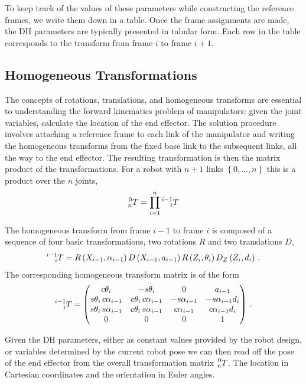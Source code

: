 \documentclass[11pt, onecolumn, oneside, reqno]{article}
\begin{document}
To keep track of the values of these parameters while constructing the reference frames, we write them down in a table. Once the frame assignments are made, the DH parameters are typically presented in tabular form. Each row in the table corresponds to the transform from frame $i$ to frame $i+1$.

\subsection{Homogeneous Transformations}
The concepts of rotations, translations, and homogeneous transforms are essential to understanding the forward kinematics problem of manipulators: given the joint variables, calculate the location of the end effector. The solution procedure involves attaching a reference frame to each link of the manipulator and writing the homogeneous transforms from the fixed base link to the subsequent links, all the way to the end effector.  The resulting transformation is then the matrix product of the transformations. For a robot with $n + 1$ links $\left\lbrace 0, \ldots , n\right\rbrace$ this is a product over the $n$ joints,
\begin{equation}
\prescript{0}{n} T = \prod_{i = 1}^n
\prescript{i-1}{i} T
\end{equation}

The homogeneous transform from frame $i-1$ to frame $i$ is composed of a sequence of four basic transformations, two rotations $R$ and two translations $D$,
\begin{equation}
\prescript{i-1}{i} T =
R \left(X_{i-1} , \alpha_{i-1}\right) D \left(X_{i-1} , a_{i-1}\right)
R \left( Z_i , \theta_i\right) D_Z \left( Z_i , d_i\right) \, .
\end{equation}
The corresponding homogeneous transform matrix is of the form 
\begin{equation}
\prescript{i-1}{i} T =
\begin{pmatrix}
c \theta_i & -s\theta_i & 0 & a_{i-1} \\
s \theta_i \, c \alpha_{i-1} & c \theta_i \, c \alpha_{i-1} & -s \alpha_{i-1} & -s \alpha_{i-1} d_i \\
s \theta_i \, s \alpha_{i-1} & c \theta_i \, s \alpha_{i-1} &  c \alpha_{i-1} & c \alpha_{i-1} d_i \\
0 & 0 & 0 & 1
\end{pmatrix} \, .
\end{equation}

Given the DH parameters, either as constant values provided by the robot design, or variables determined by the current robot pose we can then read off the pose of the end effector from the overall transformation matrix $\prescript{0}{n} T$. The location in Cartesian coordinates and the orientation in Euler angles.
\end{document}
